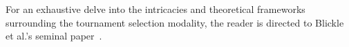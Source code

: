 

  For an exhaustive delve into the intricacies and theoretical frameworks 
  surrounding the tournament selection modality, the reader is directed to 
  Blickle et al.'s seminal 
  paper~\autocite{blickleMathematicalAnalysisTournament1995}.
